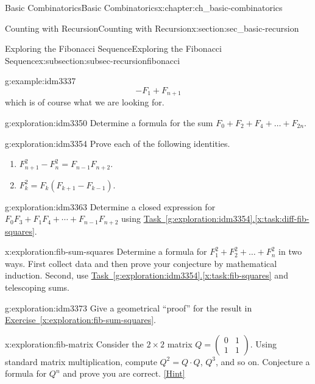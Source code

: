 \documentclass[oneside,10pt,]{book}
\numberwithin{equation}{chapter}
\newcommand{\amp}{&}
\begin{document}
\begin{chapterptx}{Basic Combinatorics}{}{Basic Combinatorics}{}{}{x:chapter:ch_basic-combinatorics}
\begin{sectionptx}{Counting with Recursion}{}{Counting with Recursion}{}{}{x:section:sec_basic-recursion}
\begin{subsectionptx}{Exploring the Fibonacci Sequence}{}{Exploring the Fibonacci Sequence}{}{}{x:subsection:subsec-recursionfibonacci}
\begin{example}{}{g:example:idm3337}
\begin{equation*}
-F_1 + F_{n+1}
\end{equation*}
which is of course what we are looking for.%
\end{example}
\begin{exploration}{}{g:exploration:idm3350}%
Determine a formula for the sum  \(F_{0} + F_{2} + F_{4} + \ldots + F_{2n}\).%
\end{exploration}
\begin{exploration}{}{g:exploration:idm3354}%
Prove each of the following identities.%
\begin{enumerate}[font=\bfseries,label=(\alph*),ref=\alph*]
\item\label{x:task:diff-fib-squares}\(F_{n + 1}^{2} - F_{n}^{2} = F_{n - 1}F_{n + 2}\).%
\item\label{x:task:fib-squares}\(F_{k}^{2} = F_{k}(F_{k + 1} - F_{k - 1})\).%
\end{enumerate}
\end{exploration}
\begin{exploration}{}{g:exploration:idm3363}%
Determine a closed expression for \(F_{0}F_{3}
+ F_{1}F_{4} + \cdots +
F_{n-1}F_{n+2}\) using \hyperref[x:task:diff-fib-squares]{Task~\ref{g:exploration:idm3354}.\ref{x:task:diff-fib-squares}}.%
\end{exploration}
\begin{exploration}{}{x:exploration:fib-sum-squares}%
Determine a formula for \(F_{1}^{2} + F_{2}^{2} + \ldots + F_{n}^{2}\) in two ways.  First collect data and then prove your conjecture by mathematical induction.  Second, use \hyperref[x:task:fib-squares]{Task~\ref{g:exploration:idm3354}.\ref{x:task:fib-squares}} and telescoping sums.%
\end{exploration}
\begin{exploration}{}{g:exploration:idm3373}%
Give a geometrical ``proof'' for the result in \hyperref[x:exploration:fib-sum-squares]{Exercise~\ref{x:exploration:fib-sum-squares}}.%
\end{exploration}
\begin{exploration}{}{x:exploration:fib-matrix}%
Consider the \(2\times 2\) matrix \(Q =
\begin{pmatrix}
0 \amp 1\\
1 \amp 1
\end{pmatrix}.\) Using standard matrix multiplication, compute \(Q^2 = Q\cdot Q\), \(Q^3\), and so on.  Conjecture a formula for \(Q^n\) and prove you are correct.%
\space\hspace*{0pt}\hfill{\tiny\hyperlink{g:hint:idm3386-back}{[Hint]}}\end{exploration}

\end{subsectionptx}
\end{sectionptx}
\end{chapterptx}
\end{document}
